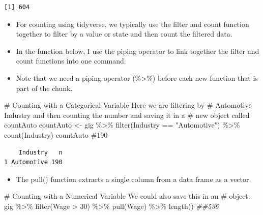 \documentclass[
  letterpaper,
  DIV=11,
  numbers=noendperiod]{scrreprt}
\newenvironment{Shaded}{\begin{snugshade}}{\end{snugshade}}
\newcommand{\CommentTok}[1]{\textcolor[rgb]{0.37,0.37,0.37}{#1}}
\newcommand{\DecValTok}[1]{\textcolor[rgb]{0.68,0.00,0.00}{#1}}
\newcommand{\DocumentationTok}[1]{\textcolor[rgb]{0.37,0.37,0.37}{\textit{#1}}}
\newcommand{\FunctionTok}[1]{\textcolor[rgb]{0.28,0.35,0.67}{#1}}
\newcommand{\NormalTok}[1]{\textcolor[rgb]{0.00,0.23,0.31}{#1}}
\newcommand{\OtherTok}[1]{\textcolor[rgb]{0.00,0.23,0.31}{#1}}
\newcommand{\SpecialCharTok}[1]{\textcolor[rgb]{0.37,0.37,0.37}{#1}}
\newcommand{\StringTok}[1]{\textcolor[rgb]{0.13,0.47,0.30}{#1}}
\providecommand{\tightlist}{%
  \setlength{\itemsep}{0pt}\setlength{\parskip}{0pt}}\usepackage{longtable,booktabs,array}
\begin{document}
\begin{Shaded}
\end{Shaded}

\begin{verbatim}
[1] 604
\end{verbatim}

\begin{itemize}
\tightlist
\item
  For counting using tidyverse, we typically use the filter and count
  function together to filter by a value or state and then count the
  filtered data.
\item
  In the function below, I use the piping operator to link together the
  filter and count functions into one command.
\item
  Note that we need a piping operator (\%\textgreater\%) before each new
  function that is part of the chunk.
\end{itemize}

\begin{Shaded}
\begin{Highlighting}[]
\CommentTok{\# Counting with a Categorical Variable Here we are filtering by}
\CommentTok{\# Automotive Industry and then counting the number and saving it in a}
\CommentTok{\# new object called countAuto}
\NormalTok{countAuto }\OtherTok{\textless{}{-}}\NormalTok{ gig }\SpecialCharTok{\%\textgreater{}\%}
    \FunctionTok{filter}\NormalTok{(Industry }\SpecialCharTok{==} \StringTok{"Automotive"}\NormalTok{) }\SpecialCharTok{\%\textgreater{}\%}
    \FunctionTok{count}\NormalTok{(Industry)}
\NormalTok{countAuto  }\CommentTok{\#190}
\end{Highlighting}
\end{Shaded}

\begin{verbatim}
    Industry   n
1 Automotive 190
\end{verbatim}

\begin{itemize}
\tightlist
\item
  The pull() function extracts a single column from a data frame as a
  vector.
\end{itemize}

\begin{Shaded}
\begin{Highlighting}[]
\CommentTok{\# Counting with a Numerical Variable We could also save this in an}
\CommentTok{\# object.}
\NormalTok{gig }\SpecialCharTok{\%\textgreater{}\%}
    \FunctionTok{filter}\NormalTok{(Wage }\SpecialCharTok{\textgreater{}} \DecValTok{30}\NormalTok{) }\SpecialCharTok{\%\textgreater{}\%}
    \FunctionTok{pull}\NormalTok{(Wage) }\SpecialCharTok{\%\textgreater{}\%}
    \FunctionTok{length}\NormalTok{()  }\DocumentationTok{\#\#536}
\end{Highlighting}
\end{Shaded}
\end{document}

